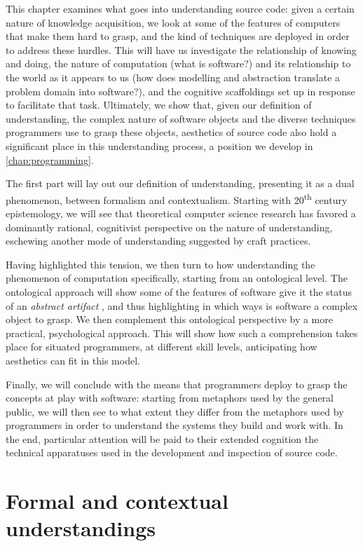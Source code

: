 This chapter examines what goes into understanding source code: given a certain nature of knowledge acquisition, we look at some of the features of computers that make them hard to grasp, and the kind of techniques are deployed in order to address these hurdles. This will have us investigate the relationship of knowing and doing, the nature of computation (what is software?) and its relationship to the world as it appears to us (how does modelling and abstraction translate a problem domain into software?), and the cognitive scaffoldings set up in response to facilitate that task. Ultimately, we show that, given our definition of understanding, the complex nature of software objects and the diverse techniques programmers use to grasp these objects, aesthetics of source code also hold a significant place in this understanding process, a position we develop in \autoref{chap:programming}.

The first part will lay out our definition of understanding, presenting it as a dual phenomenon, between formalism and contextualism. Starting with 20\textsuperscript{th} century epistemology, we will see that theoretical computer science research has favored a dominantly rational, cognitivist perspective on the nature of understanding, eschewing another mode of understanding suggested by craft practices.

Having highlighted this tension, we then turn to how understanding the phenomenon of computation specifically, starting from an ontological level. The ontological approach will show some of the features of software give it the status of an \emph{abstract artifact} \citep{irmak_software_2012}, and thus highlighting in which ways is software a complex object to grasp. We then complement this ontological perspective by a more practical, psychological approach. This will show how such a comprehension takes place for situated programmers, at different skill levels, anticipating how aesthetics can fit in this model.

Finally, we will conclude with the means that programmers deploy to grasp the concepts at play with software: starting from metaphors used by the general public, we will then see to what extent they differ from the metaphors used by programmers in order to understand the systems they build and work with. In the end, particular attention will be paid to their extended cognition the technical apparatuses used in the development and inspection of source code.

\section{Formal and contextual understandings}
\label{sec:formal-contextual-understandings}

